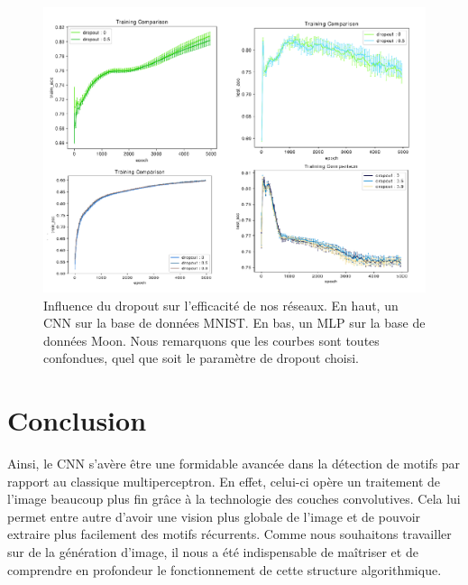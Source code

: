 \begin{figure}[!ht]
\centering
\includegraphics[width=340pt]{images/cnn/resultat_dropout.png}
\caption{Influence du dropout sur l'efficacité de nos réseaux. En haut, un CNN sur la base de données MNIST. En bas, un MLP sur la base de données Moon. Nous remarquons que les courbes sont toutes confondues, quel que soit le paramètre de dropout choisi.}
\label{resultat_dropout}
\end{figure}

\section{Conclusion}

Ainsi, le CNN s'avère être une formidable avancée dans la détection de motifs par rapport au classique multiperceptron. En effet, celui-ci opère un traitement de l'image beaucoup plus fin grâce à la technologie des couches convolutives. Cela lui permet entre autre d'avoir une vision plus globale de l'image et de pouvoir extraire plus facilement des motifs récurrents. Comme nous souhaitons travailler sur de la génération d'image, il nous a été indispensable de maîtriser et de comprendre en profondeur le fonctionnement de cette structure algorithmique. 

 



